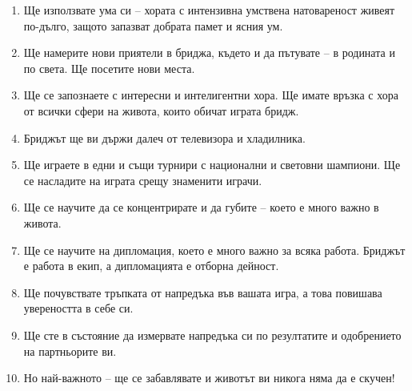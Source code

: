 \documentclass[10pt,a5paper]{extarticle}
\begin{document}
\begin{enumerate}
  \item Ще използвате ума си – хората с интензивна умствена натовареност живеят по-дълго, защото запазват добрата памет и ясния ум.
  \item Ще намерите нови приятели в бриджа, където и да пътувате – в родината и по света. Ще посетите нови места.
  \item Ще се запознаете с интересни и интелигентни хора. Ще имате връзка с хора от всички сфери на живота, които обичат играта бридж.
  \item Бриджът ще ви държи далеч от телевизора и хладилника.
  \item Ще играете в едни и същи турнири с национални и световни шампиони. Ще се насладите на играта срещу знаменити играчи.
  \item Ще се научите да се концентрирате и да губите – което е много важно в живота.
  \item Ще се научите на дипломация, което е много важно за всяка работа. Бриджът е работа в екип, а дипломацията е отборна дейност.
  \item Ще почувствате тръпката от напредъка във вашата игра, а това повишава увереността в себе си.
  \item Ще сте в състояние да измервате напредъка си по резултатите и одобрението на партньорите ви.
  \item Но най-важното – ще се забавлявате и животът ви никога няма да е скучен!
\end{enumerate}
\end{document}
